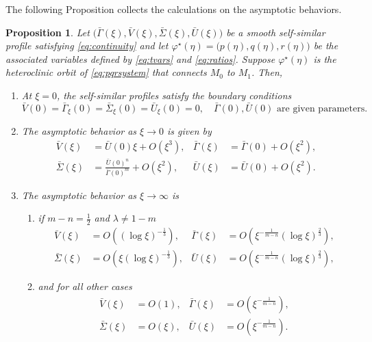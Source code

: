 \documentclass[a4paper,11pt]{article}
\def\bG{\bar{\Gamma}}
\def\bS{\bar{\Sigma}}
\def\bV{\bar{V}}
\def\bU{\bar{U}}
\newtheorem{proposition}{Proposition}[section]
\numberwithin{step}{dummy}
\begin{document}
The following Proposition collects the calculations on the asymptotic behaviors.
\begin{proposition}
 Let $\big(\bG(\xi),\bV(\xi),\bS(\xi),\bU(\xi)\big)$ be a smooth self-similar profile satisfying \eqref{eq:continuity} and let $\varphi^\star(\eta)=\big(p(\eta),q(\eta),r(\eta)\big)$ be the associated variables defined by \eqref{eq:tvars} and \eqref{eq:ratios}. Suppose $\varphi^\star(\eta)$ is the heteroclinic orbit of \eqref{eq:pqrsystem} that connects $M_0$ to $M_1$. Then, 
 \begin{enumerate}
  \item[(i)] At $\xi = 0$, the self-similar profiles satisfy the boundary conditions
    \begin{equation*}
    \bar{V}(0) = \bar\Gamma_\xi(0) = \bar\Sigma_\xi(0) = \bar{U}_\xi(0)=0, \quad \text{$\bar{ \Gamma}(0), \bar{ U}(0)$ are given parameters.}
  \end{equation*}
  \item[(ii)] The asymptotic behavior as $\xi \rightarrow 0$ is given by
  \begin{equation} \label{eq:ss_asymp0}
  \begin{aligned}
    \bV(\xi) &= \bU(0)\xi + O(\xi^3), & \bG(\xi) &= \bG(0) + O(\xi^2), \\
    \bS(\xi) &= \frac{\bU(0)^n}{\bG(0)^m}+ O(\xi^2), & \bU(\xi) &= \bU(0) + O(\xi^2).
  \end{aligned}
  \end{equation}
  \item[(iii)] The asymptotic behavior as $\xi \rightarrow \infty$ is	
  \begin{enumerate}
   \item if $m-n = \frac{1}{2}$ and $\lambda \ne 1-m$
  \begin{equation} \label{eq:ss_asymp1_special}
  \begin{aligned}
    \bV(\xi) &= O((\log\xi)^{-\frac{1}{3}}), &    \bG(\xi) &= O(\xi^{- \frac{1}{m-n}}(\log\xi)^{\frac{2}{3}}),\\
    \bS(\xi) &= O(\xi(\log\xi)^{-\frac{1}{3}}), &   \bU(\xi) &= O(\xi^{- \frac{1}{m-n}}(\log\xi)^{\frac{2}{3}}),
  \end{aligned}
  \end{equation}
   \item and for all other cases 
  \begin{equation} \label{eq:ss_asymp1}
  \begin{aligned}
    \bV(\xi) &= O(1), &    \bG(\xi) &= O(\xi^{- \frac{1}{m-n}}),\\
    \bS(\xi) &= O(\xi), &   \bU(\xi) &= O(\xi^{- \frac{1}{m-n}}).
  \end{aligned}
  \end{equation}
  \end{enumerate}
 \end{enumerate}
 
\end{proposition}
\end{document}

